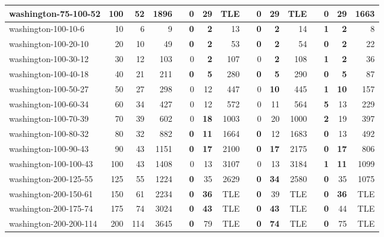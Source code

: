 \begin{table}[!ht]
{\begin{tabular}{lrrrrrrrrrrrlrrr}
washington-75-100-52 & 100 & 52 & 1896 &  & \textbf{0} & \textbf{29} & TLE &  & \textbf{0} & \textbf{29} & TLE &  & \textbf{0} & \textbf{29} & 1663 \\ \hline
washington-100-10-6 & 10 & 6 & 9 &  & \textbf{0} & \textbf{2} & 13 &  & \textbf{0} & \textbf{2} & 14 &  & \textbf{1} & \textbf{2} & 8 \\
washington-100-20-10 & 20 & 10 & 49 &  & \textbf{0} & \textbf{2} & 53 &  & \textbf{0} & \textbf{2} & 54 &  & \textbf{0} & \textbf{2} & 22 \\
washington-100-30-12 & 30 & 12 & 103 &  & 0 & \textbf{2} & 107 &  & 0 & \textbf{2} & 108 &  & \textbf{1} & \textbf{2} & 36 \\
washington-100-40-18 & 40 & 21 & 211 &  & \textbf{0} & \textbf{5} & 280 &  & \textbf{0} & \textbf{5} & 290 &  & \textbf{0} & \textbf{5} & 87 \\
washington-100-50-27 & 50 & 27 & 298 &  & 0 & 12 & 447 &  & 0 & \textbf{10} & 445 &  & \textbf{1} & \textbf{10} & 157 \\
washington-100-60-34 & 60 & 34 & 427 &  & 0 & 12 & 572 &  & 0 & 11 & 564 &  & \textbf{5} & 13 & 229 \\
washington-100-70-39 & 70 & 39 & 602 &  & 0 & \textbf{18} & 1003 &  & 0 & 20 & 1000 &  & \textbf{2} & 19 & 397 \\
washington-100-80-32 & 80 & 32 & 882 &  & \textbf{0} & \textbf{11} & 1664 &  & \textbf{0} & 12 & 1683 &  & \textbf{0} & 13 & 492 \\
washington-100-90-43 & 90 & 43 & 1151 &  & \textbf{0} & \textbf{17} & 2100 &  & \textbf{0} & \textbf{17} & 2175 &  & \textbf{0} & \textbf{17} & 806 \\
washington-100-100-43 & 100 & 43 & 1408 &  & 0 & 13 & 3107 &  & 0 & 13 & 3184 &  & \textbf{1} & \textbf{11} & 1099 \\ \hline
washington-200-125-55 & 125 & 55 & 1224 &  & \textbf{0} & 35 & 2629 &  & \textbf{0} & \textbf{34} & 2580 &  & \textbf{0} & 35 & 1075 \\
washington-200-150-61 & 150 & 61 & 2234 &  & \textbf{0} & \textbf{36} & TLE &  & \textbf{0} & 39 & TLE &  & \textbf{0} & \textbf{36} & TLE \\
washington-200-175-74 & 175 & 74 & 3024 &  & \textbf{0} & \textbf{43} & TLE &  & \textbf{0} & \textbf{43} & TLE &  & \textbf{0} & 44 & TLE \\
washington-200-200-114 & 200 & 114 & 3645 &  & \textbf{0} & 79 & TLE &  & \textbf{0} & \textbf{74} & TLE &  & \textbf{0} & 75 & TLE \\

\end{tabular}}
\end{table}

